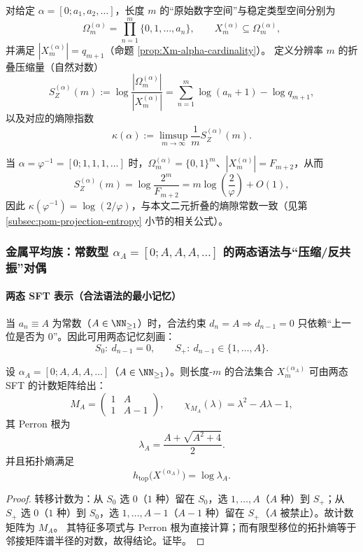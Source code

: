 \begin{definition}\label{def:ostrowski-entropy-gap}
对给定 $\alpha=[0;a_1,a_2,\dots]$，长度 $m$ 的“原始数字空间”与稳定类型空间分别为
\[
\Omega_m^{(\alpha)}=\prod_{n=1}^{m}\{0,1,\dots,a_n\},
\qquad
X_m^{(\alpha)}\subseteq \Omega_m^{(\alpha)},
\]
并满足 $|X_m^{(\alpha)}|=q_{m+1}$（命题 \ref{prop:Xm-alpha-cardinality}）。
定义分辨率 $m$ 的折叠压缩量（自然对数）
\[
S_Z^{(\alpha)}(m):=\log\frac{|\Omega_m^{(\alpha)}|}{|X_m^{(\alpha)}|}
=\sum_{n=1}^{m}\log(a_n+1)-\log q_{m+1},
\]
以及对应的熵隙指数
\[
\kappa(\alpha):=\limsup_{m\to\infty}\frac{1}{m}S_Z^{(\alpha)}(m).
\]
\end{definition}

\begin{remark}[黄金分支为最简周期特例]
当 $\alpha=\varphi^{-1}=[0;1,1,1,\dots]$ 时，$\Omega_m^{(\alpha)}=\{0,1\}^m$、$|X_m^{(\alpha)}|=F_{m+2}$，从而
\[
S_Z^{(\alpha)}(m)=\log\frac{2^m}{F_{m+2}}
=m\log\!\left(\frac{2}{\varphi}\right)+O(1),
\]
因此 $\kappa(\varphi^{-1})=\log(2/\varphi)$，与本文二元折叠的熵隙常数一致（见第 \ref{subsec:pom-projection-entropy} 小节的相关公式）。
\end{remark}

\subsubsection{金属平均族：常数型 \texorpdfstring{$\alpha_A=[0;A,A,A,\dots]$}{alphaA} 的两态语法与“压缩/反共振”对偶}

\paragraph{两态 SFT 表示（合法语法的最小记忆）}
当 $a_n\equiv A$ 为常数（$A\in\NN_{\ge 1}$）时，合法约束
\(
d_n=A\Rightarrow d_{n-1}=0
\)
只依赖“上一位是否为 $0$”。因此可用两态记忆刻画：
\[
S_0:\ d_{n-1}=0,\qquad S_+:\ d_{n-1}\in\{1,\dots,A\}.
\]

\begin{proposition}\label{prop:metallic-two-state-sft}
设 $\alpha_A=[0;A,A,A,\dots]$（$A\in\NN_{\ge 1}$）。则长度-$m$ 的合法集合 $X_m^{(\alpha_A)}$ 可由两态 SFT 的计数矩阵给出：
\[
M_A=
\begin{pmatrix}
1 & A\\
1 & A-1
\end{pmatrix},
\qquad
\chi_{M_A}(\lambda)=\lambda^2-A\lambda-1,
\]
其 Perron 根为
\[
\lambda_A=\frac{A+\sqrt{A^2+4}}{2}.
\]
并且拓扑熵满足
\[
h_{\mathrm{top}}\bigl(X^{(\alpha_A)}\bigr)=\log\lambda_A.
\]
\end{proposition}
\begin{proof}
转移计数为：从 $S_0$ 选 $0$（$1$ 种）留在 $S_0$，选 $1,\dots,A$（$A$ 种）到 $S_+$；从 $S_+$ 选 $0$（$1$ 种）到 $S_0$，选 $1,\dots,A-1$（$A-1$ 种）留在 $S_+$（$A$ 被禁止）。故计数矩阵为 $M_A$。
其特征多项式与 Perron 根为直接计算；而有限型移位的拓扑熵等于邻接矩阵谱半径的对数，故得结论。证毕。
\end{proof}


